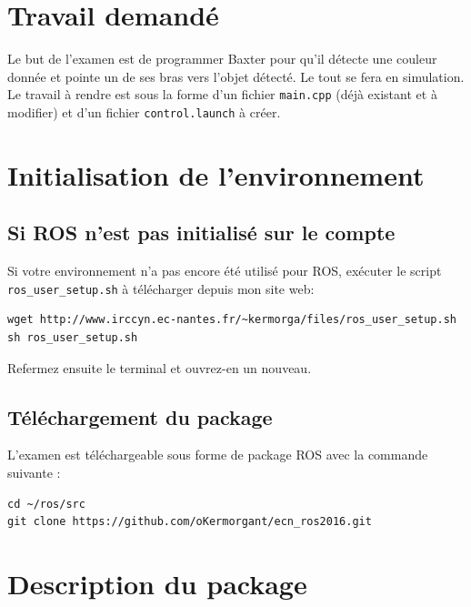 \documentclass{ecnreport}
\begin{document}


\section{Travail demandé}

Le but de l'examen est de programmer Baxter pour qu'il détecte une couleur donnée et pointe un de ses bras vers l'objet détecté. Le tout se fera en simulation.
Le travail à rendre est sous la forme d'un fichier \texttt{main.cpp} (déjà existant et à modifier) et d'un fichier \texttt{control.launch} à créer.

\section{Initialisation de l'environnement}
  
\subsection{Si ROS n'est pas initialisé sur le compte}

Si votre environnement n'a pas encore été utilisé pour ROS, exécuter le script \texttt{ros\_user\_setup.sh} à télécharger depuis mon site web:
\begin{lstlisting}
wget http://www.irccyn.ec-nantes.fr/~kermorga/files/ros_user_setup.sh
sh ros_user_setup.sh
\end{lstlisting}
Refermez ensuite le terminal et ouvrez-en un nouveau.

\subsection{Téléchargement du package}

L'examen est téléchargeable sous forme de package ROS avec la commande suivante : 
\begin{center}
\begin{lstlisting}
cd ~/ros/src
git clone https://github.com/oKermorgant/ecn_ros2016.git
\end{lstlisting}
\end{center}



\section{Description du package}
\end{document}
